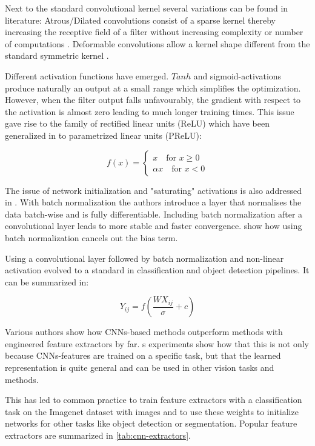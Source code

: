 	Next to the standard convolutional kernel several variations can be found in literature: Atrous/Dilated convolutions consist of a sparse kernel thereby increasing the receptive field of a filter without increasing complexity or number of computations . Deformable convolutions allow a kernel shape different from the standard symmetric kernel .
	
	Different activation functions have emerged. $Tanh$ and sigmoid-activations produce naturally an output at a small range which simplifies the optimization. However, when the filter output falls unfavourably, the gradient with respect to the activation is almost zero leading to much longer training times. This issue gave rise to the family of rectified linear units (ReLU) which have been generalized in  to parametrized linear units (PReLU):
	
	$$
	f(x) = \begin{cases}
	x \quad \text{for } x \geq 0 \\
	\alpha x \quad \text{for } x < 0
	\end{cases}
	$$
	
	The issue of network initialization and "saturating" activations is also addressed in \cite{Ioffe2015}. With batch normalization the authors introduce a layer that normalises the data batch-wise and is fully differentiable. Including batch normalization after a convolutional layer leads to more stable and faster convergence.  show how using batch normalization cancels out the bias term.
	
	Using a convolutional layer followed by batch normalization and non-linear activation evolved to a standard in classification and object detection pipelines. It can be summarized in:
	
	$$
	Y_{ij} = f(\frac{WX_{ij}}{\sigma}+c)
	$$
	
	
	
	
	
	Various authors show how \acp{CNN}-based methods outperform methods with engineered feature extractors by far. \citeauthor{Razavian}s experiments show how that this is not only because \acp{CNN}-features are trained on a specific task, but that  the learned representation is quite general and can be used in other vision tasks and methods.
	
	This has led to common practice to train feature extractors with a classification task on the Imagenet dataset with  images and to use these weights to initialize networks for other tasks like object detection or segmentation. Popular feature extractors are summarized in \autoref{tab:cnn-extractors}.
	
